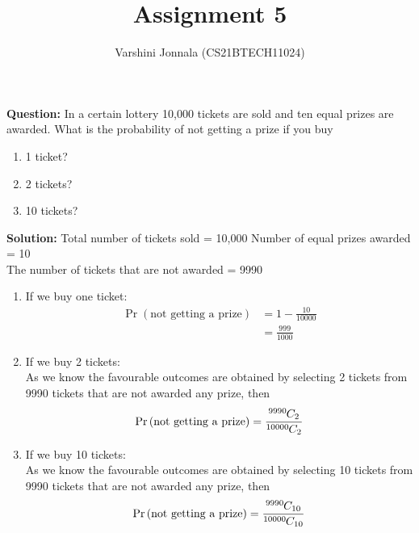 \documentclass[journal,12pt,twocolumn]{IEEEtran}
\title{Assignment 5}
\author{Varshini Jonnala (CS21BTECH11024)}
\newcommand{\question}{\noindent \textbf{Question: }}
\newcommand{\solution}{\noindent \textbf{Solution: }}
\providecommand{\pr}[1]{\ensuremath{\Pr\left(#1\right)}}
\newcommand*{\permcomb}[4][0mu]{{{}^{#3}\mkern#1#2_{#4}}}
\newcommand*{\comb}[1][-1mu]{\permcomb[#1]{C}}
\begin{document}
\maketitle
\question
In a certain lottery 10,000 tickets are sold and ten equal prizes are awarded. What is the probability of not getting a prize if you buy
\begin{enumerate}[label=(\alph*)]
\item 1 ticket?
\item 2 tickets?
\item 10 tickets?
\end{enumerate}
    
\solution 
Total number of tickets sold = 10,000
Number of equal prizes awarded = 10\\
The number of tickets that are not awarded = 9990

\begin{enumerate}[label=(\alph*)]
\item If we buy one ticket:
\begin{align}
\pr{\text{not getting a prize}} &= 1 - \frac{10}{10000}\\
&= \frac{999}{1000}
\end{align}
         
\item If we buy 2 tickets:\\
As we know the favourable outcomes are obtained by selecting 2 tickets from 9990 tickets that are not awarded any prize, then
\begin{align}
\pr{\text{not getting a prize}} =  \frac{\comb{9990}{2}}{\comb{10000}{2}} 
\end{align}

\item If we buy 10 tickets:\\
As we know the favourable outcomes are obtained by selecting 10 tickets from 9990 tickets that are not awarded any prize, then
\begin{align}
\pr{\text{not getting a prize}} =  \frac{\comb{9990}{10}}{\comb{10000}{10}} 
\end{align}

\end{enumerate}
\end{document}
